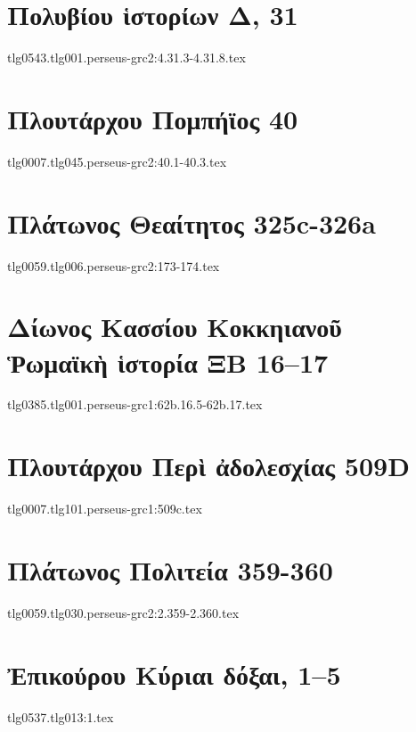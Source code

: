 \documentclass[a4paper,12pt,twoside]{report}
\begin{document}
\chapter[Πολυβίου Ἱστορίων Δ]{\textgreek[variant=ancient]{Πολυβίου ἱστορίων Δ,} 31}
{tlg0543.tlg001.perseus-grc2:4.31.3-4.31.8.tex}

\chapter[Πλουτάρχου Πομπήϊος]{\textgreek[variant=ancient]{Πλουτάρχου Πομπήϊος} 40}
{tlg0007.tlg045.perseus-grc2:40.1-40.3.tex}

\chapter[Πλάτωνος Θεαίτητος]{\textgreek[variant=ancient]{Πλάτωνος Θεαίτητος} 325c-326a}
{tlg0059.tlg006.perseus-grc2:173-174.tex}

\chapter[Δίωνος Κασσίου Ῥωμαϊκὴ ἱστορία ΞΒ 16–17]{\textgreek[variant=ancient]{Δίωνος Κασσίου Κοκκηιανοῦ \\Ῥωμαϊκὴ ἱστορία ΞΒ} 16–17}
{tlg0385.tlg001.perseus-grc1:62b.16.5-62b.17.tex}

\chapter[Πλουτάρχου Περὶ ἀδολεσχίας  509D]{\textgreek[variant=ancient]{Πλουτάρχου Περὶ ἀδολεσχίας} 509D}
{tlg0007.tlg101.perseus-grc1:509c.tex}

\chapter[Πλάτωνος Πολιτεία]{\textgreek[variant=ancient]{Πλάτωνος Πολιτεία} 359-360}
{tlg0059.tlg030.perseus-grc2:2.359-2.360.tex}

\chapter[Ἐπικούρου Κύριαι δόξαι]{\textgreek[variant=ancient]{Ἐπικούρου Κύριαι δόξαι,} 1–5}
{tlg0537.tlg013:1.tex}
\end{document}
